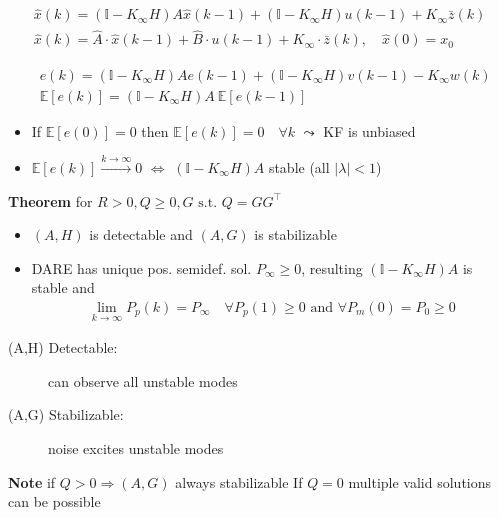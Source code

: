 \begin{align*}
    \widehat{x}(k) = 
    (\mathbb{I} \!-\! K_\infty H) A \widehat{x}({\scriptstyle k - 1}) + 
    (\mathbb{I} \!-\! K_\infty H) u({\scriptstyle k - 1}) \!+\! K_\infty \bar{z}(k)\\
    \widehat{x}(k) =  \widehat{A} \cdot \widehat{x}({\scriptstyle k - 1}) + \widehat{B} \cdot u({\scriptstyle k - 1}) + K_\infty \cdot \bar{z}(k), \quad \widehat{x}(0) = x_0
\end{align*}


\begin{align*}
    &e(k) = (\mathbb{I} \!-\! K_\infty H)A e(k\!-\!\!1) 
    \!+\! (\mathbb{I} \!-\! K_\infty H) v(k\!-\!1) \!-\! K_\infty w({\scriptstyle k}) \\
    &\mathbb{E}[e(k)] \!=\! (\mathbb{I} \!-\! K_\infty H)A \ \mathbb{E}[e(k\!-\!1)]
\end{align*}
\begin{itemize}[leftmargin=1em, itemsep=0pt]
    \item If $\mathbb{E}[e(0)] = 0$ then $\mathbb{E}[e(k)] = 0 \quad \forall k$ $\leadsto$ KF is unbiased
    \item $\mathbb{E}[e(k)] \xrightarrow{k\to\infty} 0$ $\Leftrightarrow$ $(\mathbb{I}-K_\infty H)A$ stable (all $\lvert\lambda\rvert < 1$)
\end{itemize}

\textbf{Theorem} for $R>0, Q \geq 0, G \text{ s.t. } Q=GG^\top$
    \begin{itemize}[label=$\Leftrightarrow$, leftmargin=1.6em]
        \item $(A,H)$ is detectable and $(A,G)$ is stabilizable
        \item DARE has unique pos. semidef. sol. $P_\infty \geq 0$, 
        resulting $(\mathbb{I} - K_\infty H)A$ is stable and
        \begin{align*}
            \lim_{k\to\infty} P_p(k) = P_\infty \quad \forall P_p(1) \geq 0 \text{ and } \forall P_m(0) = P_0 \geq 0
        \end{align*}
    \end{itemize}
\begin{description}
    \item[(A,H) Detectable:] can observe all unstable modes 
    \item[(A,G) Stabilizable:] noise excites unstable modes
\end{description}
\textbf{Note} if $Q>0 \Rightarrow (A,G)$ always stabilizable
If $Q=0$ multiple valid solutions can be possible